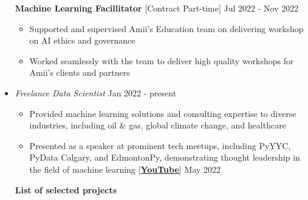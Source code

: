 \documentclass[10pt,letterpaper,sans]{moderncv} %
\begin{document}
\begin{itemize}
        \textbf{Machine Learning Facillitator} [Contract Part-time] \hfill Jul 2022 - Nov 2022
        \begin{itemize}
			\item Supported and supervised Amii's Education team on delivering workshop on AI ethics and governance

			   \item Worked seamlessly with the team to deliver high quality workshops for Amii's clients and partners

		\end{itemize}
		
\vspace{0.5cm}
	\item \href{https://hadi2525.github.io}{} \emph{\large Freelance Data Scientist} \hfill Jan 2022 - present
	\vspace{0.25cm}
	
	\begin{itemize}
		\item Provided machine learning solutions and consulting expertise to diverse industries, including oil \& gas, global climate change, and healthcare
		
		\item Presented as a speaker at prominent tech meetups, including PyYYC, PyData Calgary, and EdmontonPy, demonstrating thought leadership in the field of machine learning [\href{https://www.youtube.com/watch?v=4S_QGDHTICw}{\textbf{YouTube}}] \hfill May 2022
	\end{itemize}
	\textbf{List of selected projects}
	\begin{itemize}
		
		

\end{itemize}
\end{itemize}
\end{document}
